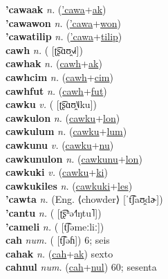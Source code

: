 \textbf{'cawaak} \textit{n.} (\hyperref['cawa]{'cawa}+\hyperref[ak]{ak})
 \label{'cawaak} \\
\textbf{'cawawon} \textit{n.} (\hyperref['cawa]{'cawa}+\hyperref[won]{won})
 \label{'cawawon} \\
\textbf{'cawatilip} \textit{n.} (\hyperref['cawa]{'cawa}+\hyperref[tilip]{tilip})
 \label{'cawatilip} \\
\textbf{cawh} \textit{n.} ( [ʈ͡ʂɑʊ̯˧˩˧])
 \label{cawh} \\
\textbf{cawhak} \textit{n.} (\hyperref[cawh]{cawh}+\hyperref[ak]{ak})
 \label{cawhak} \\
\textbf{cawhcim} \textit{n.} (\hyperref[cawh]{cawh}+\hyperref[cim]{cim})
 \label{cawhcim} \\
\textbf{cawhfut} \textit{n.} (\hyperref[cawh]{cawh}+\hyperref[fut]{fut})
 \label{cawhfut} \\
\textbf{cawku} \textit{v.} ( [ʈ͡ʂɑʊ̯˥˩ku])
 \label{cawku} \\
\textbf{cawkulon} \textit{n.} (\hyperref[cawku]{cawku}+\hyperref[lon]{lon})
 \label{cawkulon} \\
\textbf{cawkulum} \textit{n.} (\hyperref[cawku]{cawku}+\hyperref[lum]{lum})
 \label{cawkulum} \\
\textbf{cawkunu} \textit{v.} (\hyperref[cawku]{cawku}+\hyperref[nu]{nu})
 \label{cawkunu} \\
\textbf{cawkunulon} \textit{n.} (\hyperref[cawkunu]{cawkunu}+\hyperref[lon]{lon})
 \label{cawkunulon} \\
\textbf{cawkuki} \textit{v.} (\hyperref[cawku]{cawku}+\hyperref[ki]{ki})
 \label{cawkuki} \\
\textbf{cawkukiles} \textit{n.} (\hyperref[cawkuki]{cawkuki}+\hyperref[les]{les})
 \label{cawkukiles} \\
\textbf{'cawta} \textit{n.} (Eng. ⟨chowder⟩ [ˈt͡ʃaʊ̯dɚ])
 \label{'cawta} \\
\textbf{'cantu} \textit{n.} ( [ʈ͡ʂʰə˧˥ŋtu˥])
 \label{'cantu} \\
\textbf{'cameli} \textit{n.} ( [t͡ʃəmeːliː])
 \label{'cameli} \\
\textbf{cah} \textit{num.} ( [t͡ʃəɦ])
6; seis \label{cah} \\
\textbf{cahak} \textit{n.} (\hyperref[cah]{cah}+\hyperref[ak]{ak})
sexto \label{cahak} \\
\textbf{cahnul} \textit{num.} (\hyperref[cah]{cah}+\hyperref[nul]{nul})
60; sesenta \label{cahnul} \\
